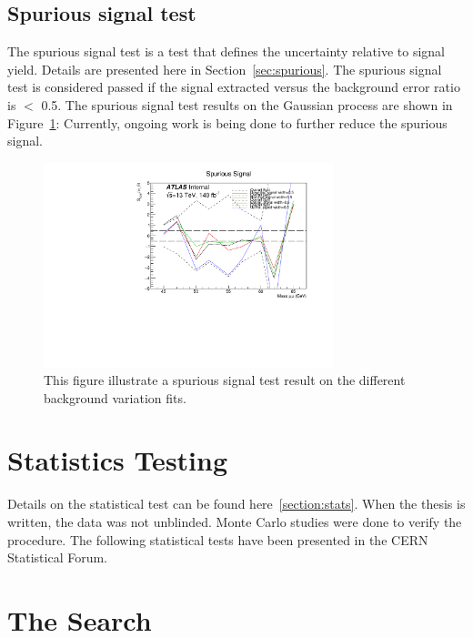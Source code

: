 \subsection{Spurious signal test}

The spurious signal test is a test that defines the uncertainty relative to signal yield. Details are presented here in Section~\ref{sec:spurious}.
The spurious signal test is considered passed if the signal extracted versus the background error ratio is $<$ 0.5.
The spurious signal test results on the Gaussian process are shown in Figure~\ref{fig:spurious}:
Currently, ongoing work is being done to further reduce the spurious signal.

\begin{figure}[!htb]
    \begin{center}
        \includegraphics[width=0.75\textwidth]{figures/chapter_dimuon/spurious}        
        \caption{
        This figure illustrate a spurious signal test result on the different background variation fits.}
        \label{fig:spurious}
    \end{center}
\end{figure}
\FloatBarrier

\section{Statistics Testing}
Details on the statistical test can be found here~\ref{section:stats}. When the thesis is written, the data was not unblinded. Monte Carlo studies were done to verify the procedure. The following statistical tests have been presented in the CERN Statistical Forum.

\section{The Search}

